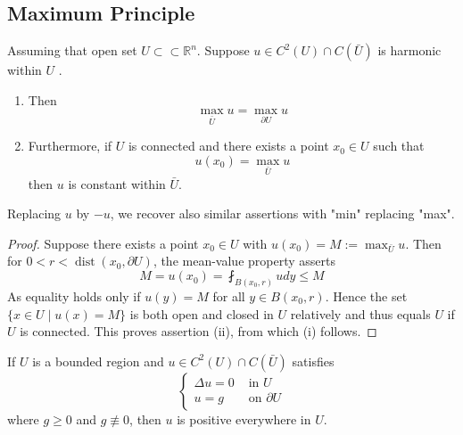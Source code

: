 \subsection{Maximum Principle}
\begin{theorem}
    Assuming that open set $U\subset\subset \mathbb{R}^n$.
    Suppose $u \in C^2(U) \cap C(\bar{U})$ is harmonic within $U$ .
    \begin{enumerate}
        \item
              Then
              \begin{equation*}
                  \max _{\bar{U}} u=\max _{\partial U} u
              \end{equation*}
        \item
              Furthermore, if $U$ is connected and there exists a point $x_0 \in U$ such that
              \begin{equation*}
                  u\left(x_0\right)=\max _{\bar{U}} u
              \end{equation*}
              then
              $u$ is constant within $\bar{U}$.
    \end{enumerate}
    Replacing $u$ by $-u$, we recover also similar assertions with "min" replacing "max".
    \begin{proof}
        Suppose there exists a point $x_0 \in U$ with $u\left(x_0\right)=M:=\max _{\bar{U}} u$. Then for $0<r<\operatorname{dist}\left(x_0, \partial U\right)$, the mean-value property asserts
        \begin{equation*}
            M=u\left(x_0\right)=\fint_{B\left(x_0, r\right)} u d y \leq M
        \end{equation*}
        As equality holds only if $u(y)=M$ for all $y \in B\left(x_0, r\right)$. Hence the set $\{x \in U \mid u(x)=M\}$ is both open and closed in $U$ relatively and thus equals $U$ if $U$ is connected. This proves assertion (ii), from which (i) follows.
    \end{proof}
\end{theorem}
\begin{corollary}
    If $U$ is a bounded region and $u \in C^2(U) \cap C(\bar{U})$ satisfies
    \begin{equation*}
        \left\{\begin{aligned}
            \Delta u=0 & \text { in } U          \\
            u=g        & \text { on } \partial U
        \end{aligned}\right.
    \end{equation*}
    where $g \geq 0$ and $g \not\equiv0$, then $u$ is positive everywhere in $U$.
\end{corollary}
